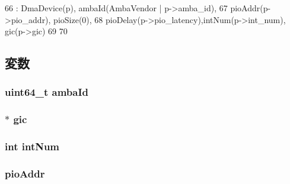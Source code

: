 \begin{DoxyCode}
66     : DmaDevice(p), ambaId(AmbaVendor | p->amba_id),
67       pioAddr(p->pio_addr), pioSize(0),
68       pioDelay(p->pio_latency),intNum(p->int_num), gic(p->gic)
69 {
70 }
\end{DoxyCode}


\subsection{変数}
\hypertarget{classAmbaDmaDevice_a3201bf99dce0ba0bb6a5fd367f3dd76e}{
\subsubsection[{ambaId}]{\setlength{\rightskip}{0pt plus 5cm}uint64\_\-t {\bf ambaId}}}
\label{classAmbaDmaDevice_a3201bf99dce0ba0bb6a5fd367f3dd76e}
\hypertarget{classAmbaDmaDevice_a2e2266dca56928f63667e994933169ee}{
\subsubsection[{gic}]{$\ast$ {\bf gic}}}
\label{classAmbaDmaDevice_a2e2266dca56928f63667e994933169ee}
\hypertarget{classAmbaDmaDevice_a9bd4d49b818d8cf1a6dee0576d2ff039}{
\subsubsection[{intNum}]{\setlength{\rightskip}{0pt plus 5cm}int {\bf intNum}}}
\label{classAmbaDmaDevice_a9bd4d49b818d8cf1a6dee0576d2ff039}
\hypertarget{classAmbaDmaDevice_afa7a5450c2bc6f73bc056050c9177193}{
\subsubsection[{pioAddr}]{ {\bf pioAddr}}}
